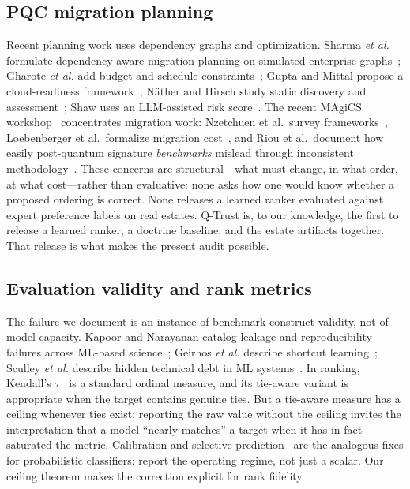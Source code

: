 \documentclass[conference,10pt]{IEEEtran}
\begin{document}
\subsection{PQC migration planning}
Recent planning work uses dependency graphs and optimization. Sharma \emph{et al.} formulate
dependency-aware migration planning on simulated enterprise graphs~\cite{sharma2026}; Gharote
\emph{et al.} add budget and schedule constraints~\cite{gharote2026}; Gupta and Mittal propose
a cloud-readiness framework~\cite{gupta2026}; N\"ather and Hirsch study static discovery and
assessment~\cite{nother2026}; Shaw uses an LLM-assisted risk score~\cite{shaw2026}. The recent
MAgiCS workshop~\cite{magics2026} concentrates migration work: Nzetchuen et al.\ survey
frameworks~\cite{nzetchuen2026}, Loebenberger et al.\ formalize migration cost~\cite{loebenberger2026},
and Riou et al.\ document how easily post-quantum signature \emph{benchmarks} mislead through
inconsistent methodology~\cite{riou2026}. These concerns are structural---what must change, in
what order, at what cost---rather than evaluative: none asks how one would know whether a
proposed ordering is correct. None releases a learned ranker evaluated against expert
preference labels on real estates. Q-Trust is, to our knowledge, the first to release a learned
ranker, a doctrine baseline, and the estate artifacts together. That release is what makes the
present audit possible.

\subsection{Evaluation validity and rank metrics}
The failure we document is an instance of benchmark construct validity, not of model capacity.
Kapoor and Narayanan catalog leakage and reproducibility failures across ML-based
science~\cite{kapoor2023}; Geirhos \emph{et al.} describe shortcut learning~\cite{geirhos2020};
Sculley \emph{et al.} describe hidden technical debt in ML systems~\cite{sculley2015}. In
ranking, Kendall's $\tau$~\cite{kendall1938} is a standard ordinal measure, and its tie-aware
variant is appropriate when the target contains genuine ties. But a tie-aware measure has a
ceiling whenever ties exist; reporting the raw value without the ceiling invites the
interpretation that a model ``nearly matches'' a target when it has in fact saturated the
metric. Calibration and selective prediction~\cite{guo2017,geifman2017} are the analogous fixes
for probabilistic classifiers: report the operating regime, not just a scalar. Our ceiling
theorem makes the correction explicit for rank fidelity.
\end{document}
